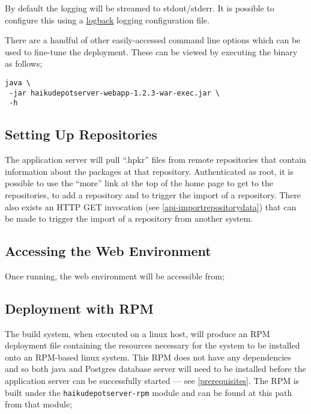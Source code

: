 By default the logging will be streamed to stdout/stderr.  It is possible to configure this using a \href{http://logback.qos.ch/}{logback} logging configuration file.

There are a handful of other easily-accessed command line options which can be used to fine-tune the deployment.  These can be viewed by executing the binary as follows;

\begin{verbatim}
java \
 -jar haikudepotserver-webapp-1.2.3-war-exec.jar \
 -h
\end{verbatim}

\subsection{Setting Up Repositories}
\label{settinguprepositories}

The application server will pull ``.hpkr'' files from remote repositories that contain information about the packages at that repository.  Authenticated as root, it is possible to use the ``more'' link at the top of the home page to get to the repositories, to add a repository and to trigger the import of a repository.  There also exists an HTTP GET invocation (see \ref{api-importrepositorydata}) that can be made to trigger the import of a repository from another system.

\subsection{Accessing the Web Environment}

Once running, the web environment will be accessible from;


\subsection{Deployment with RPM}

The build system, when executed on a linux host, will produce an RPM deployment file containing the resources necessary for the system to be installed onto an RPM-based linux system.  This RPM does not have any dependencies and so both java and Postgres database server will need to be installed before the application server can be successfully started --- see \ref{prerequisites}.  The RPM is built under the {\tt haikudepotserver-rpm} module and can be found at this path from that module;

